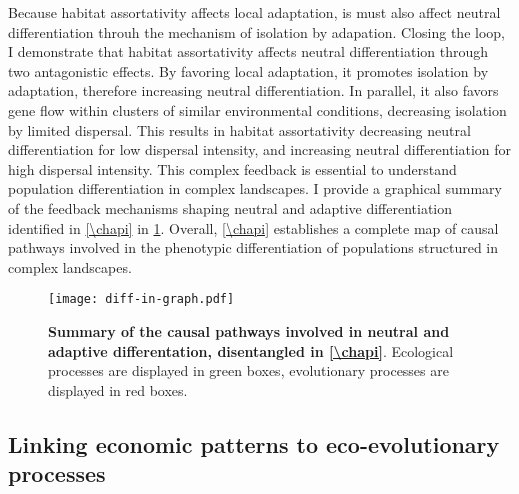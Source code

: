 Because habitat assortativity affects local adaptation, is must also affect neutral differentiation throuh the mechanism of isolation by adapation. Closing the loop, I demonstrate that habitat assortativity affects neutral differentiation through two antagonistic effects. By favoring local adaptation, it promotes isolation by adaptation, therefore increasing neutral differentiation. In parallel, it also favors gene flow within clusters of similar environmental conditions, decreasing isolation by limited dispersal. This results in habitat assortativity decreasing neutral differentiation for low dispersal intensity, and increasing neutral differentiation for high dispersal intensity.
% 
This complex feedback is essential to understand population differentiation in complex landscapes.
% 
I provide a graphical summary of the feedback mechanisms shaping neutral and adaptive differentiation identified in \cref{\chapi} in \cref{fig:summary_diff-in-graph}. Overall, \cref{\chapi} establishes a complete map of causal pathways involved in the phenotypic differentiation of populations structured in complex landscapes. %

\begin{figure}[t]
    \centering
    \texttt{[image: diff-in-graph.pdf]}
    \caption{\textbf{Summary of the causal pathways involved in neutral and adaptive differentation, disentangled in \cref{\chapi}}. Ecological processes are displayed in green boxes, evolutionary processes are displayed in red boxes.}
    \label{fig:summary_diff-in-graph}
\end{figure}


\subsection{Linking economic patterns to eco-evolutionary processes}


